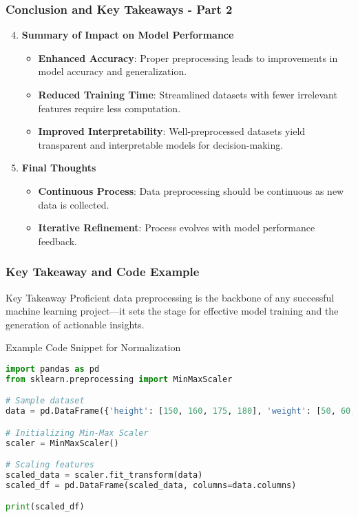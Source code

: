 \documentclass[aspectratio=169]{beamer}
\begin{document}
\begin{frame}[fragile]
  \frametitle{Conclusion and Key Takeaways - Part 2}
  
  \begin{enumerate}
      \setcounter{enumi}{3} %
      \item \textbf{Summary of Impact on Model Performance}
          \begin{itemize}
              \item \textbf{Enhanced Accuracy}: Proper preprocessing leads to improvements in model accuracy and generalization.
              \item \textbf{Reduced Training Time}: Streamlined datasets with fewer irrelevant features require less computation.
              \item \textbf{Improved Interpretability}: Well-preprocessed datasets yield transparent and interpretable models for decision-making.
          \end{itemize}
  
      \item \textbf{Final Thoughts}
          \begin{itemize}
              \item \textbf{Continuous Process}: Data preprocessing should be continuous as new data is collected.
              \item \textbf{Iterative Refinement}: Process evolves with model performance feedback.
          \end{itemize}
  \end{enumerate}

\end{frame}

\begin{frame}[fragile]
  \frametitle{Key Takeaway and Code Example}
  
  \begin{block}{Key Takeaway}
      Proficient data preprocessing is the backbone of any successful machine learning project—it sets the stage for effective model training and the generation of actionable insights.
  \end{block}

  \vspace{1cm}

  \begin{block}{Example Code Snippet for Normalization}
      \begin{lstlisting}[language=Python]
import pandas as pd
from sklearn.preprocessing import MinMaxScaler

# Sample dataset
data = pd.DataFrame({'height': [150, 160, 175, 180], 'weight': [50, 60, 75, 80]})

# Initializing Min-Max Scaler
scaler = MinMaxScaler()

# Scaling features
scaled_data = scaler.fit_transform(data)
scaled_df = pd.DataFrame(scaled_data, columns=data.columns)

print(scaled_df)
      \end{lstlisting}
  \end{block}
  
\end{frame}
\end{document}
